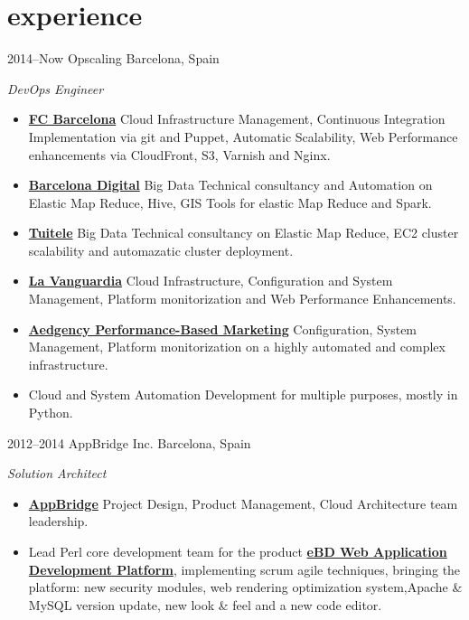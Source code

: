 \documentclass[]{friggeri-cv} %
\begin{document}
\section{experience}
\begin{entrylist}

\entry
{2014--Now}
{Opscaling}
{Barcelona, Spain}
{\emph{DevOps Engineer} \\
\begin{itemize}
\item \href{http://www.fcbarcelona.com/}{\textbf{FC Barcelona}} Cloud Infrastructure Management, Continuous Integration Implementation via git and Puppet, Automatic Scalability, Web Performance enhancements via CloudFront, S3, Varnish and Nginx.
\item \href{http://www.bdigital.org/}{\textbf{Barcelona Digital}} Big Data Technical consultancy and Automation on Elastic Map Reduce, Hive, GIS Tools for elastic Map Reduce and Spark.
\item \href{http://www.tuitele.tv/}{\textbf{Tuitele}} Big Data Technical consultancy on Elastic Map Reduce, EC2 cluster scalability and automazatic cluster deployment.
\item \href{http://www.lavanguardia.com/}{\textbf{La Vanguardia}} Cloud Infrastructure, Configuration and System Management, Platform monitorization and Web Performance Enhancements.
\item \href{http://www.aedgency.com/}{\textbf{Aedgency Performance-Based Marketing}} Configuration, System Management, Platform monitorization on a highly automated and complex infrastructure.
\item Cloud and System Automation Development for multiple purposes, mostly in Python.   
\end{itemize}}
\pagebreak
\entry
{2012--2014}
{AppBridge Inc.}
{Barcelona, Spain}
{\emph{Solution Architect} \\
\begin{itemize}
\item \href{http://www.appbridge.com}{\textbf{AppBridge}} Project Design, Product Management, Cloud Architecture team leadership.
\item Lead Perl core development team for the product \href{http://www.ebdsoft.com}{\textbf{eBD Web Application Development Platform}}, implementing scrum agile techniques, bringing the platform: new security modules, web rendering optimization system,Apache \& MySQL version update, new look \& feel and a new code editor.

\end{itemize}}
\end{entrylist}
\end{document}
